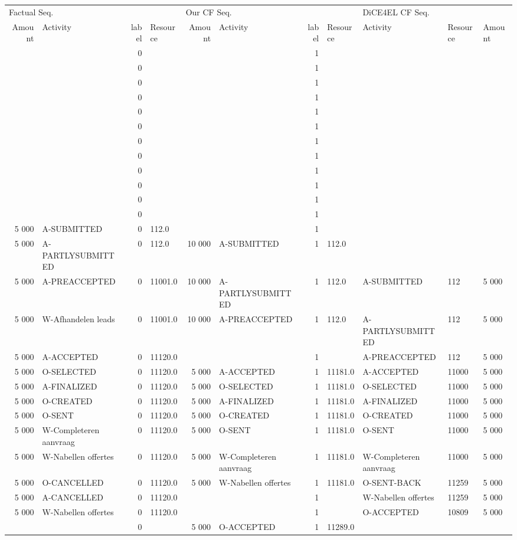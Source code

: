 \begin{tabular}{rlrlrlrllll}
\toprule
\multicolumn{4}{l}{Factual Seq.} & \multicolumn{4}{l}{Our CF Seq.} & \multicolumn{3}{l}{DiCE4EL CF Seq.} \\
Amount & Activity & label & Resource & Amount & Activity & label & Resource & Activity & Resource & Amount \\
\midrule
 &  & 0 &  &  &  & 1 &  &  &  &  \\
 &  & 0 &  &  &  & 1 &  &  &  &  \\
 &  & 0 &  &  &  & 1 &  &  &  &  \\
 &  & 0 &  &  &  & 1 &  &  &  &  \\
 &  & 0 &  &  &  & 1 &  &  &  &  \\
 &  & 0 &  &  &  & 1 &  &  &  &  \\
 &  & 0 &  &  &  & 1 &  &  &  &  \\
 &  & 0 &  &  &  & 1 &  &  &  &  \\
 &  & 0 &  &  &  & 1 &  &  &  &  \\
 &  & 0 &  &  &  & 1 &  &  &  &  \\
 &  & 0 &  &  &  & 1 &  &  &  &  \\
 &  & 0 &  &  &  & 1 &  &  &  &  \\
5 000 & A-SUBMITTED & 0 & 112.0 &  &  & 1 &  &  &  &  \\
5 000 & A-PARTLYSUBMITTED & 0 & 112.0 & 10 000 & A-SUBMITTED & 1 & 112.0 &  &  &  \\
5 000 & A-PREACCEPTED & 0 & 11001.0 & 10 000 & A-PARTLYSUBMITTED & 1 & 112.0 & A-SUBMITTED & 112 & 5 000 \\
5 000 & W-Afhandelen leads & 0 & 11001.0 & 10 000 & A-PREACCEPTED & 1 & 112.0 & A-PARTLYSUBMITTED & 112 & 5 000 \\
5 000 & A-ACCEPTED & 0 & 11120.0 &  &  & 1 &  & A-PREACCEPTED & 112 & 5 000 \\
5 000 & O-SELECTED & 0 & 11120.0 & 5 000 & A-ACCEPTED & 1 & 11181.0 & A-ACCEPTED & 11000 & 5 000 \\
5 000 & A-FINALIZED & 0 & 11120.0 & 5 000 & O-SELECTED & 1 & 11181.0 & O-SELECTED & 11000 & 5 000 \\
5 000 & O-CREATED & 0 & 11120.0 & 5 000 & A-FINALIZED & 1 & 11181.0 & A-FINALIZED & 11000 & 5 000 \\
5 000 & O-SENT & 0 & 11120.0 & 5 000 & O-CREATED & 1 & 11181.0 & O-CREATED & 11000 & 5 000 \\
5 000 & W-Completeren aanvraag & 0 & 11120.0 & 5 000 & O-SENT & 1 & 11181.0 & O-SENT & 11000 & 5 000 \\
5 000 & W-Nabellen offertes & 0 & 11120.0 & 5 000 & W-Completeren aanvraag & 1 & 11181.0 & W-Completeren aanvraag & 11000 & 5 000 \\
5 000 & O-CANCELLED & 0 & 11120.0 & 5 000 & W-Nabellen offertes & 1 & 11181.0 & O-SENT-BACK & 11259 & 5 000 \\
5 000 & A-CANCELLED & 0 & 11120.0 &  &  & 1 &  & W-Nabellen offertes & 11259 & 5 000 \\
5 000 & W-Nabellen offertes & 0 & 11120.0 &  &  & 1 &  & O-ACCEPTED & 10809 & 5 000 \\
 &  & 0 &  & 5 000 & O-ACCEPTED & 1 & 11289.0 &  &  &  \\
\bottomrule
\end{tabular}
